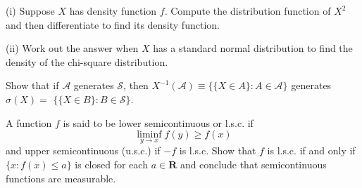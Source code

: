 \documentclass[en, normal, 11pt, black]{elegantnote}
\newenvironment{exercise}[1]{\begin{tcolorbox}[title=#1]}{\end{tcolorbox}}
\begin{document}
    \begin{exercise}{1.2.7}
        (i) Suppose $X$ has density function $f$. Compute the distribution function of $X^{2}$ and then differentiate to find its density function. 
        
        (ii) Work out the answer when $X$ has a standard normal distribution to find the density of the chi-square distribution. 
    \end{exercise}

    \begin{exercise}{1.3.1}
        Show that if $\mathcal{A}$ generates $\mathcal{S}$, then $X^{-1}(\mathcal{A}) \equiv\{\{X \in A\}: A \in \mathcal{A}\}$ generates $\sigma(X)=$ $\{\{X \in B\}: B \in \mathcal{S}\} .$
    \end{exercise}

    \begin{exercise}{1.3.5}
        A function $f$ is said to be lower semicontinuous or l.s.c. if
        $$
        \liminf _{y \rightarrow x} f(y) \geq f(x)
        $$
        and upper semicontinuous (u.s.c.) if $-f$ is l.s.c. Show that $f$ is l.s.c. if and only if $\{x: f(x) \leq a\}$ is closed for each $a \in \mathbf{R}$ and conclude that semicontinuous functions are measurable.
    \end{exercise}
    
\end{document}
